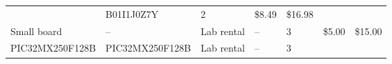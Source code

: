 \documentclass[]{article}
\begin{document}
\begin{longtable}[]{@{}lllllll@{}}
\begin{minipage}[t]{0.10\columnwidth}
\end{minipage} & \begin{minipage}[t]{0.17\columnwidth}\raggedright
B01I1J0Z7Y\strut
\end{minipage} & \begin{minipage}[t]{0.11\columnwidth}\raggedright
2\strut
\end{minipage} & \begin{minipage}[t]{0.06\columnwidth}\raggedright
\$8.49\strut
\end{minipage} & \begin{minipage}[t]{0.07\columnwidth}\raggedright
\$16.98\strut
\end{minipage}\tabularnewline
\begin{minipage}[t]{0.15\columnwidth}\raggedright
Small board\strut
\end{minipage} & \begin{minipage}[t]{0.15\columnwidth}\raggedright
--\strut
\end{minipage} & \begin{minipage}[t]{0.10\columnwidth}\raggedright
Lab rental\strut
\end{minipage} & \begin{minipage}[t]{0.17\columnwidth}\raggedright
--\strut
\end{minipage} & \begin{minipage}[t]{0.11\columnwidth}\raggedright
3\strut
\end{minipage} & \begin{minipage}[t]{0.06\columnwidth}\raggedright
\$5.00\strut
\end{minipage} & \begin{minipage}[t]{0.07\columnwidth}\raggedright
\$15.00\strut
\end{minipage}\tabularnewline
\begin{minipage}[t]{0.15\columnwidth}\raggedright
PIC32MX250F128B\strut
\end{minipage} & \begin{minipage}[t]{0.15\columnwidth}\raggedright
PIC32MX250F128B\strut
\end{minipage} & \begin{minipage}[t]{0.10\columnwidth}\raggedright
Lab rental\strut
\end{minipage} & \begin{minipage}[t]{0.17\columnwidth}\raggedright
--\strut
\end{minipage} & \begin{minipage}[t]{0.11\columnwidth}\raggedright
3\strut
\end{minipage} & \begin{minipage}[t]{0.06\columnwidth}\raggedright

\end{minipage}
\end{longtable}
\end{document}
